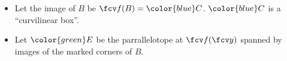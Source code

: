 \begin{frame}
\begin{itemize}
\item<7-> Let the image of $B$ be $\fcv f(B)={\color{blue}C}$. ${\color{blue}C} $ is a ``curvilinear box''. 
\item<8-> Let ${\color{green}E}$ be the parrallelotope at $\fcv f(\fcv y)$ spanned by images of the marked corners of $B$. 
\end{itemize}

\vskip 10cm
\end{frame}


